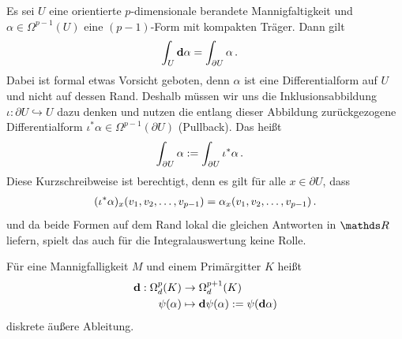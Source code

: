   \begin{satz}
    Es sei \( U \) eine orientierte \( p \)-dimensionale berandete Mannigfaltigkeit und \( \alpha\in\Omega^{p-1}(U) \) eine \( (p-1)\)-Form
    mit kompakten Träger.
    Dann gilt
    \begin{align}
      \int_{U} \mathbf{d}\alpha &= \int_{\partial U} \alpha \,\text{.}
    \end{align}
    Dabei ist formal etwas Vorsicht geboten, denn \( \alpha \) ist eine Differentialform auf \( U \) und nicht auf dessen Rand.
    Deshalb müssen wir uns die Inklusionsabbildung \( \iota:\partial U \hookrightarrow U \) dazu denken und nutzen die entlang dieser Abbildung
    zurückgezogene Differentialform \( \iota^{*}\alpha\in\Omega^{p-1}(\partial U) \) (Pullback).
    Das heißt
    \begin{align}
      \int_{\partial U} \alpha &:= \int_{\partial U} \iota^{*}\alpha \,\text{.}
    \end{align}
    Diese Kurzschreibweise ist berechtigt, denn es gilt für alle \( x\in\partial U \), dass
    \begin{align}
    \label{eqPullbackEntlangInklusion}
      (\iota^{*}\alpha)_{x}(v_{1},v_{2},\ldots,v_{p-1}) = \alpha_{x}(v_{1},v_{2},\ldots,v_{p-1}) \,\text{.}
    \end{align}
    und da beide Formen auf dem Rand lokal die gleichen Antworten in \( \R \) liefern, spielt das auch für die Integralauswertung keine Rolle.
  \end{satz}

  \begin{definition}
    \label{defAeussereAbleitung}
    Für eine Mannigfalligkeit \( M \) und einem Primärgitter \( K \) heißt 
    \begin{align}
      \label{eqAeussereAbleitung}
      \begin{aligned}
        \mathbf{d} : \Omega^{p}_{d}(K) &\rightarrow \Omega^{p+1}_{d}(K) \\
               \psi(\alpha) &\mapsto \mathbf{d}\psi(\alpha):=\psi(\mathbf{d} \alpha)
      \end{aligned}
    \end{align}
    diskrete äußere Ableitung.
  \end{definition}
    

